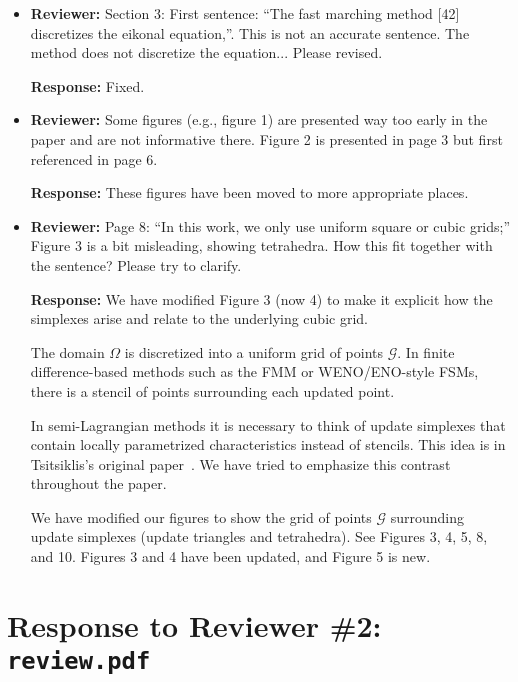 \documentclass{article}
\begin{document}
\begin{itemize}

\item \textbf{Reviewer:} Section 3: First sentence: ``The fast
  marching method [42] discretizes the eikonal equation,''. This is
  not an accurate sentence. The method does not discretize the
  equation... Please revised.

  \textbf{Response:} Fixed.

\item \textbf{Reviewer:} Some figures (e.g., figure 1) are presented
  way too early in the paper and are not informative there. Figure 2
  is presented in page 3 but first referenced in page 6.

  \textbf{Response:} These figures have been moved to more appropriate
  places.

\item \textbf{Reviewer:} Page 8: ``In this work, we only use uniform
  square or cubic grids;'' Figure 3 is a bit misleading, showing
  tetrahedra. How this fit together with the sentence? Please try to
  clarify.

  \textbf{Response:} We have modified Figure 3 (now 4) to make it
  explicit how the simplexes arise and relate to the underlying cubic
  grid.

  The domain $\Omega$ is discretized into a uniform grid of points
  $\mathcal{G}$. In finite difference-based methods such as the FMM or
  WENO/ENO-style FSMs, there is a stencil of points surrounding each
  updated point.

  In semi-Lagrangian methods it is necessary to think of update
  simplexes that contain locally parametrized characteristics instead
  of stencils. This idea is in Tsitsiklis's original
  paper~\cite{tsitsiklis1995efficient}. We have tried to emphasize
  this contrast throughout the paper.

  We have modified our figures to show the grid of points
  $\mathcal{G}$ surrounding update simplexes (update triangles and
  tetrahedra). See Figures 3, 4, 5, 8, and 10. Figures 3 and 4 have
  been updated, and Figure 5 is new.

\end{itemize}

\vspace{1em}

\section*{Response to Reviewer \#2: \texttt{review.pdf}}
\end{document}
